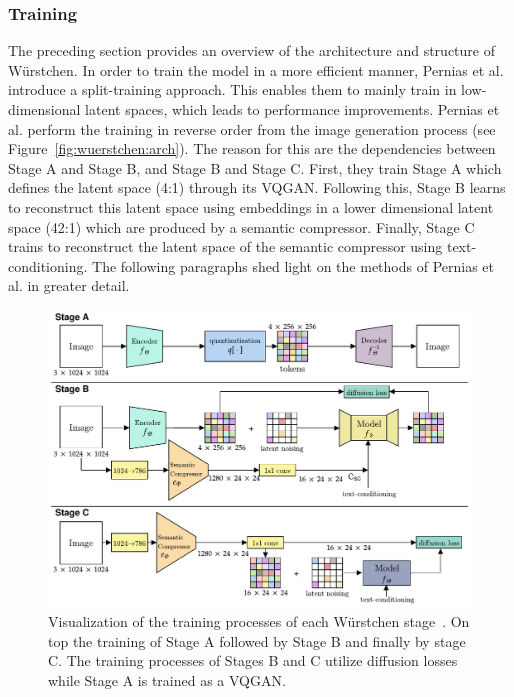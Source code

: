 \subsubsection{Training}
\label{sec:wuerstchen:training}
The preceding section provides an overview of the architecture and structure
of W\"urstchen.
In order to train the model in a more efficient manner, Pernias et
al.~\cite{pernias2024wrstchen} introduce a split-training approach. This enables
them to mainly train in low-dimensional latent spaces, which leads to
performance improvements. Pernias et al. perform the training in reverse order
from the image generation process (see Figure~\ref{fig:wuerstchen:arch}).
The reason for this are the dependencies between Stage A and Stage B, and Stage B and Stage C.
First, they train Stage A which defines the latent space (4:1) through its VQGAN.
Following this, Stage B learns to reconstruct this latent space using embeddings in a
lower dimensional latent space (42:1) which are produced by a semantic compressor.
Finally, Stage C trains to reconstruct the latent space of the semantic
compressor using text-conditioning. The following paragraphs shed light on the methods
of Pernias et al. in greater detail.
\begin{figure}[t]
    \includegraphics[width=\textwidth]{assets/wuerstchen_training.pdf}
    \caption{Visualization of the training processes of each W\"urstchen stage~\cite{pernias2024wrstchen}.
        On top the training of Stage A followed by Stage B and finally by stage C.
        The training processes of Stages B and C utilize diffusion losses while
        Stage A is trained as a VQGAN.}
    \label{fig:wuerstchen:training}
\end{figure}

